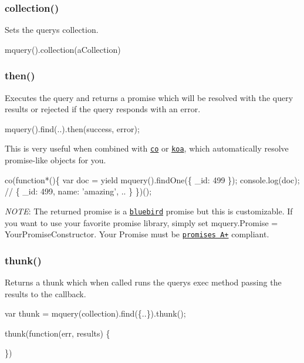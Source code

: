 \subsubsection*{collection()}

Sets the querys collection.


\begin{DoxyCode}
mquery().collection(aCollection)
\end{DoxyCode}


\subsubsection*{then()}

Executes the query and returns a promise which will be resolved with the query results or rejected if the query responds with an error.


\begin{DoxyCode}
mquery().find(..).then(success, error);
\end{DoxyCode}


This is very useful when combined with \href{https://github.com/visionmedia/co}{\tt co} or \href{https://github.com/koajs/koa}{\tt koa}, which automatically resolve promise-\/like objects for you.


\begin{DoxyCode}
co(function*()\{
  var doc = yield mquery().findOne(\{ \_id: 499 \});
  console.log(doc); // \{ \_id: 499, name: 'amazing', .. \}
\})();
\end{DoxyCode}


{\itshape N\+O\+TE}\+: The returned promise is a \href{https://github.com/petkaantonov/bluebird/}{\tt bluebird} promise but this is customizable. If you want to use your favorite promise library, simply set {\ttfamily mquery.\+Promise = Your\+Promise\+Constructor}. Your {\ttfamily Promise} must be \href{http://promisesaplus.com/}{\tt promises A+} compliant.

\subsubsection*{thunk()}

Returns a thunk which when called runs the query\textquotesingle{}s {\ttfamily exec} method passing the results to the callback.


\begin{DoxyCode}
var thunk = mquery(collection).find(\{..\}).thunk();

thunk(function(err, results) \{

\})
\end{DoxyCode}


